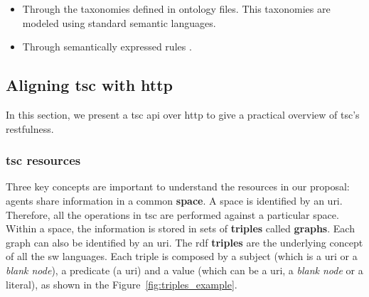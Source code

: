 \begin{description}
\begin{enumerate}
\begin{itemize}
		      \item Through the taxonomies defined in ontology files. %
		            This taxonomies are modeled using standard semantic languages. %
		      \item Through semantically expressed rules \citep{berners-lee_n3logic:_2008}. %
		    \end{itemize}
            \end{enumerate}
\end{description}



\subsection{Aligning \acs{tsc} with \acs{http}}
\label{sec:align_tsc_http}


In this section, we present a \ac{tsc} \acs{api} over \ac{http} to give a practical overview of \ac{tsc}'s \acs{rest}fulness.

\subsubsection{\acs{tsc} resources}

Three key concepts are important to understand the resources in our proposal: agents share information in a common \textbf{space}.
A space is identified by an \acs{uri}.
Therefore, all the operations in \ac{tsc} are performed against a particular space.
Within a space, the information is stored in sets of \textbf{triples} called \textbf{graphs}.
Each graph can also be identified by an \acs{uri}.
The \acs{rdf} \textbf{triples} are the underlying concept of all the \ac{sw} languages.
Each triple is composed by a subject (which is a \acs{uri} or a \emph{blank node}), a predicate (a \acs{uri}) and a value (which can be a \acs{uri}, a \emph{blank node} or a literal), as shown in the Figure~\ref{fig:triples_example}.

